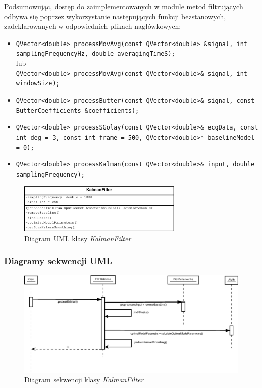 Podsumowując, dostęp do zaimplementowanych w module metod filtrujących odbywa się poprzez wykorzystanie następujących funkcji bezstanowych, zadeklarowanych w odpowiednich plikach nagłówkowych:

\begin{itemize}

\item \texttt{QVector<double> processMovAvg(const QVector<double> \&signal, int samplingFrequencyHz, double averagingTimeS);}\\ lub \\ \texttt{QVector<double> processMovAvg(const QVector<double>\& signal, int windowSize);}
\item \texttt{QVector<double> processButter(const QVector<double>\& signal, const ButterCoefficients \&coefficients);}
\item \texttt{QVector<double> processSGolay(const QVector<double>\& ecgData, const int deg = 3, const int frame = 500, QVector<double>* baselineModel = 0);}
\item \texttt{QVector<double> processKalman(const QVector<double>\& input, double samplingFrequency);}
\end{itemize}

\begin{figure}[H]
\centering
	\includegraphics[width=0.7\textwidth]{ECG_BASELINE/figures/KalmanFilter.eps}
\caption{Diagram UML klasy \textit{KalmanFilter}}
\label{KF-UML}
\end{figure}


\subsubsection{Diagramy sekwencji UML}

\begin{figure}[H]
\centering
	\includegraphics[width=\textwidth]{ECG_BASELINE/figures/KalmanDiagram.eps}
\caption{Diagram sekwencji klasy \textit{KalmanFilter}}
\label{KF-Diagram}
\end{figure}

